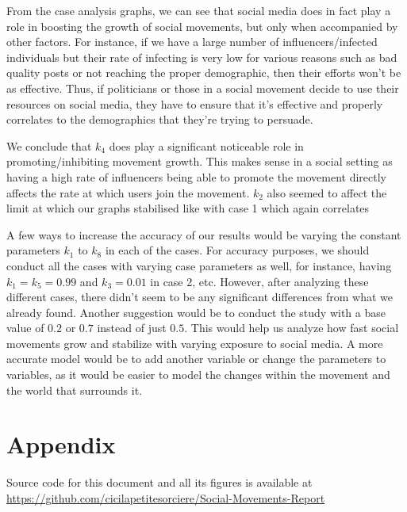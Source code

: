 \documentclass{article}
\begin{document}
    From the case analysis graphs, we can see that social media does in fact play a role in boosting the growth of social movements, but only when accompanied by other factors. For instance, if we have a large number of influencers/infected individuals but their rate of infecting is very low for various reasons such as bad quality posts or not reaching the proper demographic, then their efforts won't be as effective. Thus, if politicians or those in a social movement decide to use their resources on social media, they have to ensure that it's effective and properly correlates to the demographics that they're trying to persuade. 

    We conclude that $k_4$ does play a significant noticeable role in promoting/inhibiting movement growth. This makes sense in a social setting as having a high rate of influencers being able to promote the movement directly affects the rate at which users join the movement. $k_2$ also seemed to affect the limit at which our graphs stabilised like with case 1 which again correlates 

    A few ways to increase the accuracy of our results would be varying the constant parameters $k_1$ to $k_8$ in each of the cases. For accuracy purposes, we should conduct all the cases with varying case parameters as well, for instance, having $k_1=k_5 = 0.99$ and $k_3 = 0.01$ in case 2, etc. However, after analyzing these different cases, there didn't seem to be any significant differences from what we already found. Another suggestion would be to conduct the study with a base value of $0.2$ or $0.7$ instead of just $0.5$. This would help us analyze how fast social movements grow and stabilize with varying exposure to social media. A more accurate model would be to add another variable or change the parameters to variables, as it would be easier to model the changes within the movement and the world that surrounds it.

    \newpage
    
    
    \section{Appendix}
    Source code for this document and all its figures is available at \url{https://github.com/cicilapetitesorciere/Social-Movements-Report}
\end{document}
